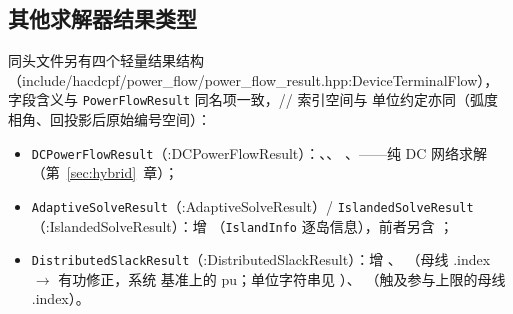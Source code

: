 \subsection{其他求解器结果类型}
同头文件另有四个轻量结果结构（include/hacdcpf/power\_flow/power\_flow\_result.hpp:DeviceTerminalFlow），字段含义与
\texttt{PowerFlowResult} 同名项一致，// 索引空间与
单位约定亦同（弧度相角、回投影后原始编号空间）：
\begin{itemize}
  \item \texttt{DCPowerFlowResult}（:DCPowerFlowResult）：、、
        、——纯 DC 网络求解（第~\ref{sec:hybrid}~章）；
  \item \texttt{AdaptiveSolveResult}（:AdaptiveSolveResult）/ \texttt{IslandedSolveResult}
        （:IslandedSolveResult）：增 （\texttt{IslandInfo} 逐岛信息），前者另含 ；
  \item \texttt{DistributedSlackResult}（:DistributedSlackResult）：增 、
        （母线 .index $\to$ 有功修正，系统
         基准上的 pu；单位字符串见
        ）、
        （触及参与上限的母线 .index）。
\end{itemize}
